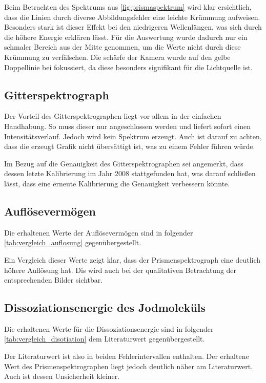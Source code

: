 \documentclass[12pt,english,ngerman]{scrartcl}
\begin{document}
Beim Betrachten des Spektrums aus \autoref{fig:prismaspektrum} wird klar
ersichtlich, dass die Linien durch diverse Abbildungsfehler eine leichte
Krümmung aufweisen. Besonders stark ist dieser Effekt bei den niedrigeren
Wellenlängen, was sich durch die höhere Energie erklären lässt. Für die
Auswertung wurde dadurch nur ein schmaler Bereich aus der Mitte genommen, um
die Werte nicht durch diese Krümmung zu verfälschen. Die schärfe der Kamera
wurde auf den gelbe Doppellinie bei 
fokussiert, da diese besonders signifikant für die Lichtquelle ist.

\subsection{Gitterspektrograph}

Der Vorteil des Gitterspektrographen liegt vor allem in der einfachen
Handhabung. So muss dieser nur angeschlossen werden und liefert sofort einen
Intensitätsverlauf. Jedoch wird kein Spektrum erzeugt. Auch ist darauf zu
achten, dass die erzeugt Grafik nicht übersättigt ist, was zu einem Fehler
führen würde.

Im Bezug auf die Genauigkeit des Gitterspektrographen sei angemerkt, dass
dessen letzte Kalibrierung im Jahr 2008 stattgefunden hat, was darauf schließen
lässt, dass eine erneute Kalibrierung die Genauigkeit verbessern könnte.

\subsection{Auflösevermögen}
Die erhaltenen Werte der Auflösevermögen sind in folgender
\autoref{tab:vergleich_auflosung} gegenübergestellt.

Ein Vergleich dieser Werte zeigt klar, dass der Prismenspektrograph eine
deutlich höhere Auflösung hat. Dis wird auch bei der qualitativen Betrachtung
der entsprechenden Bilder sichtbar.

\subsection{Dissoziationsenergie des Jodmoleküls}

Die erhaltenen Werte für die Dissoziationsenergie sind in folgender
\autoref{tab:vergleich_disotiation} dem Literaturwert gegenübergestellt.

Der Literaturwert ist also in beiden Fehlerintervallen enthalten. Der erhaltene
Wert des Prismenspektrographen liegt jedoch deutlich näher am Literaturwert.
Auch ist dessen Unsicherheit kleiner.
\end{document}
